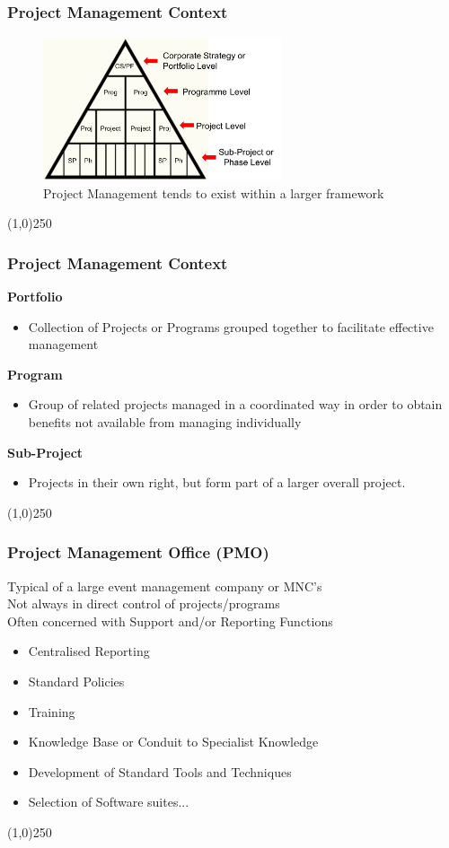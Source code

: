 \begin{frame}
\frametitle{Project Management Context}
 \begin{figure}
 	\centering
 		\includegraphics[width = 7cm]{images/context.jpg}
	\caption{Project Management tends to exist within a larger framework}
 	\label{fig:context}
 \end{figure}
\end{frame}
\begin{center}\line(1,0){250}\end{center}



\begin{frame}
\frametitle{Project Management Context}
\textbf{Portfolio}
\begin{itemize}
	\item Collection of Projects or Programs grouped together to facilitate effective management
\end{itemize}
\textbf{Program}
\begin{itemize}
	\item Group of related projects managed in a coordinated way in order to obtain benefits not available from managing individually
\end{itemize}
\textbf{Sub-Project}
\begin{itemize}
	\item Projects in their own right, but form part of a larger overall project.
\end{itemize}
\end{frame}
\begin{center}\line(1,0){250}\end{center}



\begin{frame}
\frametitle{Project Management Office (PMO)}
Typical of a large event management company or MNC's\\
Not always in direct control of projects/programs\\
Often concerned with Support and/or Reporting Functions\\
\begin{itemize}
	\item Centralised Reporting
	\item Standard Policies
	\item Training
	\item Knowledge Base or Conduit to Specialist Knowledge
	\item Development of Standard Tools and Techniques
	\item Selection of Software suites...
\end{itemize}
\end{frame}
\begin{center}\line(1,0){250}\end{center}

